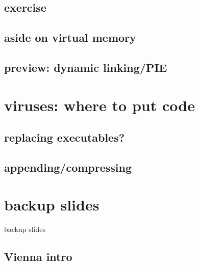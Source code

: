 

\subsection{exercise}


\subsection{aside on virtual memory}


\subsection{preview: dynamic linking/PIE}



\section{viruses: where to put code}



\subsection{replacing executables?}





\subsection{appending/compressing}






\section{backup slides}
\begin{frame}{backup slides}
\end{frame}

\subsection{Vienna intro}


